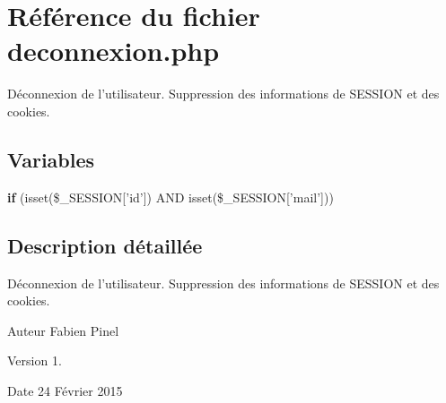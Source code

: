 \hypertarget{deconnexion_8php}{\section{Référence du fichier deconnexion.\-php}
\label{deconnexion_8php}
}


Déconnexion de l'utilisateur. Suppression des informations de S\-E\-S\-S\-I\-O\-N et des cookies.  


\subsection*{Variables}
\begin{DoxyCompactItemize}
\item 
\hypertarget{deconnexion_8php_a231329ce69923e32f0faefd42c0a3034}{{\bfseries if} (isset(\$\-\_\-\-S\-E\-S\-S\-I\-O\-N\mbox{[}'id'\mbox{]}) A\-N\-D isset(\$\-\_\-\-S\-E\-S\-S\-I\-O\-N\mbox{[}'mail'\mbox{]}))}\label{deconnexion_8php_a231329ce69923e32f0faefd42c0a3034}

\end{DoxyCompactItemize}


\subsection{Description détaillée}
Déconnexion de l'utilisateur. Suppression des informations de S\-E\-S\-S\-I\-O\-N et des cookies. \begin{DoxyAuthor}{Auteur}
Fabien Pinel 
\end{DoxyAuthor}
\begin{DoxyVersion}{Version}
1. 
\end{DoxyVersion}
\begin{DoxyDate}{Date}
24 Février 2015 
\end{DoxyDate}
